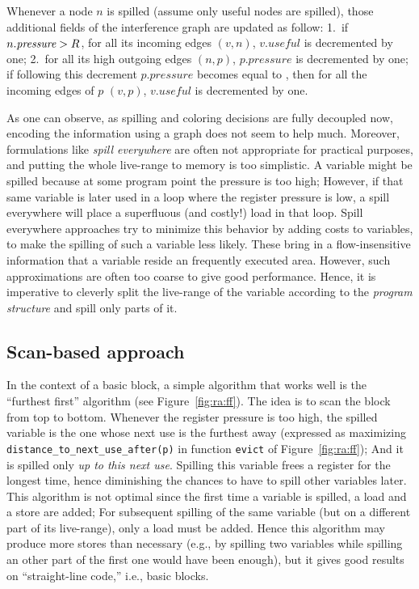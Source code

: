 {Whenever a node $n$ is spilled (assume only useful nodes are spilled), those additional fields of the interference graph are updated as follow:
1.~if $n.\textit{pressure}>R$, for all its incoming edges $(v,n)$, $v.\textit{useful}$ is decremented by one;
2.~for all its high outgoing edges $(n,p)$, $p.\textit{pressure}$ is decremented by one; if following this decrement $p.\textit{pressure}$ becomes equal to \regs, then for all the incoming edges of $p$ $(v,p)$, $v.\textit{useful}$ is decremented by one.

As one can observe, as spilling and coloring decisions are fully decoupled now, encoding the information using a graph does not seem to help much. 
Moreover, formulations like \emph{spill everywhere} are often not appropriate for practical purposes, and putting the whole live-range to memory is too simplistic. 
A variable might be spilled because at some program point the pressure is too high; 
However, if that same variable is later used in a loop where the register pressure is low, a spill everywhere will place a superfluous (and costly!) load in that loop. 
Spill everywhere approaches try to minimize this behavior by adding costs to variables, to make the spilling of such a variable less likely. 
These bring in a flow-insensitive information that a variable reside an frequently executed area. 
However, such approximations are often too coarse to give good performance. 
Hence, it is imperative to cleverly split the live-range of the variable according to the \emph{program structure} and spill only parts of it.


\subsection{Scan-based approach}
In the context of a basic block, a simple algorithm that works well is the ``furthest first'' algorithm (see Figure~\ref{fig:ra:ff}). 
The idea is to scan the block from top to bottom.
Whenever the register pressure is too high, the spilled variable is the one whose next use is the furthest away (expressed as maximizing \verb+distance_to_next_use_after(p)+ in function \verb+evict+ of Figure~\ref{fig:ra:ff}); 
And it is spilled only \emph{up to this next use}. 
Spilling this variable frees a register for the longest time, hence diminishing the chances to have to spill other variables later. 
This algorithm is not optimal since the first time a variable is spilled, a load and a store are added; 
For subsequent spilling of the same variable (but on a different part of its live-range), only a load must be added. 
Hence this algorithm may produce more stores than necessary (e.g., by spilling two variables while spilling an other part of the first one would have been enough), but it gives good results on ``straight-line code,'' i.e., basic blocks.

}
